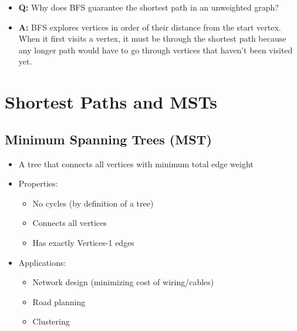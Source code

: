 \documentclass[11pt,a4paper]{article}
\begin{document}
\begin{multicols}{2}
\begin{itemize}
    \item \textbf{Q:} Why does BFS guarantee the shortest path in an unweighted graph?
    \item \textbf{A:} BFS explores vertices in order of their distance from the start vertex. When it first visits a vertex, it must be through the shortest path because any longer path would have to go through vertices that haven't been visited yet.
\end{itemize}

\section{Shortest Paths and MSTs}
\subsection{Minimum Spanning Trees (MST)}
\begin{itemize}
    \item A tree that connects all vertices with minimum total edge weight
    \item Properties:
    \begin{itemize}
        \item No cycles (by definition of a tree)
        \item Connects all vertices
        \item Has exactly Vertices-1 edges
    \end{itemize}
    \item Applications:
    \begin{itemize}
        \item Network design (minimizing cost of wiring/cables)
        \item Road planning
        \item Clustering
    \end{itemize}
\end{itemize}


\end{multicols}
\end{document}

